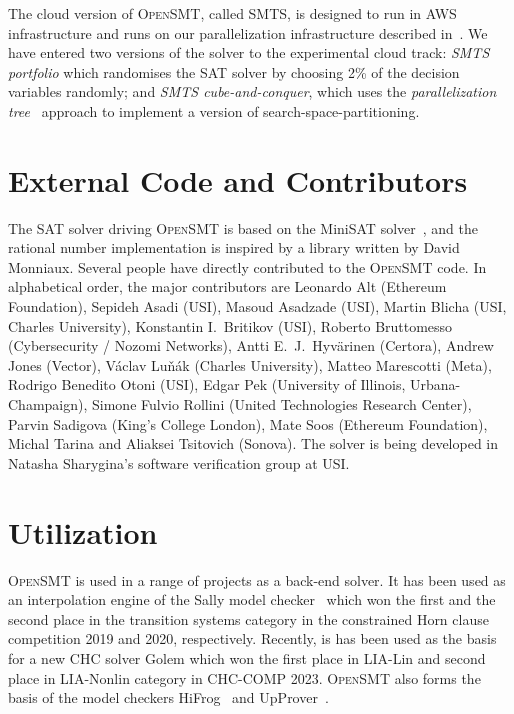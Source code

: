 \documentclass{easychair}
\newcommand{\opensmt}{\textsc{OpenSMT}\xspace}
\begin{document}
The cloud version of \opensmt, called SMTS, is designed to run in AWS
infrastructure and runs on our parallelization infrastructure described
in~\cite{MarescottiHS18}.
%
We have entered two versions of the solver to the experimental cloud
track: {\em SMTS portfolio} which randomises the SAT solver by choosing
2\% of the decision variables randomly; and {\em SMTS cube-and-conquer},
which uses the {\em parallelization tree}~\cite{HyvarinenMS:SAT15}
approach to implement a version of search-space-partitioning.
\fi

\section{External Code and Contributors}

The SAT solver driving \opensmt is based on the MiniSAT
solver~\cite{EenS:SAT03}, and the rational number implementation is
inspired by a library written by David Monniaux.  Several people have
directly contributed to the \opensmt code.  In alphabetical order, the
major contributors are
%
Leonardo Alt (Ethereum Foundation),
Sepideh Asadi (USI),
Masoud Asadzade (USI),
Martin Blicha (USI, Charles University),
Konstantin I.~Britikov (USI),
Roberto Bruttomesso (Cybersecurity / Nozomi Networks),
Antti E.~J.~Hyv{\"a}rinen (Certora),
Andrew Jones (Vector),
V{\'a}clav Lu{\v n}{\'a}k (Charles University),
Matteo Marescotti (Meta),
Rodrigo Benedito Otoni (USI),
Edgar Pek (University of Illinois, Urbana-Champaign),
Simone Fulvio Rollini (United Technologies Research Center),
Parvin Sadigova (King's College London),
Mate Soos (Ethereum Foundation),
Michal Tarina
and Aliaksei Tsitovich (Sonova).
%
The solver is being developed in Natasha Sharygina's software
verification group at USI.

\section{Utilization}

\opensmt is used in a range of projects as a back-end solver.  It has
been used as an interpolation engine of the Sally model
checker~\cite{JovanovicD:FMCAD16} which won the first and the second
place in the transition systems category in the constrained Horn clause
competition 2019 and 2020, respectively.  Recently, is has been used as
the basis for a new CHC solver Golem which won the first place in
 LIA-Lin and second place in LIA-Nonlin category in CHC-COMP 2023.  \opensmt also forms the
basis of the model checkers HiFrog~\cite{AltACMFHS17} and
UpProver~\cite{Asadi_2020b}.
\end{document}
